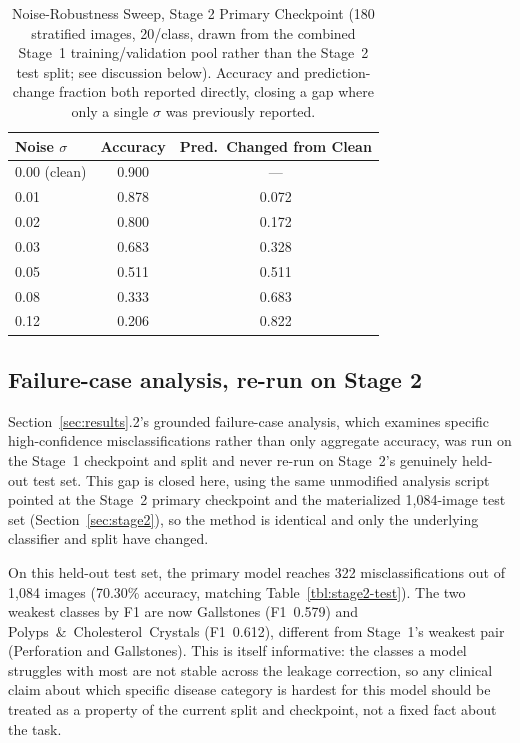 \begin{table}[!ht]
\centering
\caption{Noise-Robustness Sweep, Stage 2 Primary Checkpoint (180 stratified images, 20/class, drawn from the combined Stage~1 training/validation pool rather than the Stage~2 test split; see discussion below). Accuracy and prediction-change fraction both reported directly, closing a gap where only a single $\sigma$ was previously reported.}
\label{tbl:noise-sweep}
\begin{tabular}{lcc}
\toprule
Noise $\sigma$ & Accuracy & Pred.\ Changed from Clean \\
\midrule
0.00 (clean) & 0.900 & --- \\
0.01 & 0.878 & 0.072 \\
0.02 & 0.800 & 0.172 \\
0.03 & 0.683 & 0.328 \\
0.05 & 0.511 & 0.511 \\
0.08 & 0.333 & 0.683 \\
0.12 & 0.206 & 0.822 \\
\bottomrule
\end{tabular}
\end{table}

\subsection{Failure-case analysis, re-run on Stage 2}
\label{sec:stage2-failure-cases}

Section~\ref{sec:results}.2's grounded failure-case analysis, which examines specific high-confidence misclassifications rather than only aggregate accuracy, was run on the Stage~1 checkpoint and split and never re-run on Stage~2's genuinely held-out test set. This gap is closed here, using the same unmodified analysis script pointed at the Stage~2 primary checkpoint and the materialized 1,084-image test set (Section~\ref{sec:stage2}), so the method is identical and only the underlying classifier and split have changed.

On this held-out test set, the primary model reaches 322 misclassifications out of 1,084 images (70.30\% accuracy, matching Table~\ref{tbl:stage2-test}). The two weakest classes by F1 are now Gallstones (F1~0.579) and Polyps~\&~Cholesterol~Crystals (F1~0.612), different from Stage~1's weakest pair (Perforation and Gallstones). This is itself informative: the classes a model struggles with most are not stable across the leakage correction, so any clinical claim about which specific disease category is hardest for this model should be treated as a property of the current split and checkpoint, not a fixed fact about the task.

